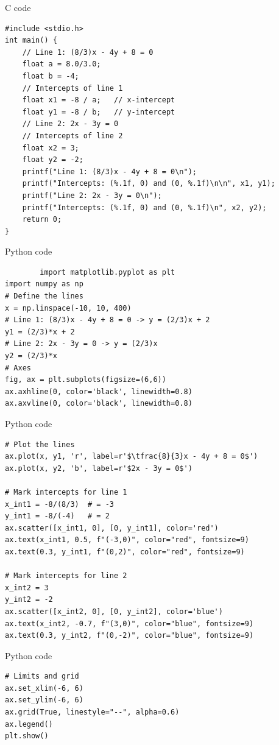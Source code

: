 \documentclass{beamer}
\begin{document}
\begin{frame}[fragile]{C code}
    \begin{lstlisting}
#include <stdio.h>
int main() {
    // Line 1: (8/3)x - 4y + 8 = 0
    float a = 8.0/3.0;
    float b = -4;
    // Intercepts of line 1
    float x1 = -8 / a;   // x-intercept
    float y1 = -8 / b;   // y-intercept
    // Line 2: 2x - 3y = 0
    // Intercepts of line 2
    float x2 = 3;
    float y2 = -2;
    printf("Line 1: (8/3)x - 4y + 8 = 0\n");
    printf("Intercepts: (%.1f, 0) and (0, %.1f)\n\n", x1, y1);
    printf("Line 2: 2x - 3y = 0\n");
    printf("Intercepts: (%.1f, 0) and (0, %.1f)\n", x2, y2);
    return 0;
}
    \end{lstlisting}
\end{frame}

\begin{frame}[fragile]{Python code}
    \begin{lstlisting}
        import matplotlib.pyplot as plt
import numpy as np
# Define the lines
x = np.linspace(-10, 10, 400)
# Line 1: (8/3)x - 4y + 8 = 0 -> y = (2/3)x + 2
y1 = (2/3)*x + 2
# Line 2: 2x - 3y = 0 -> y = (2/3)x
y2 = (2/3)*x
# Axes
fig, ax = plt.subplots(figsize=(6,6))
ax.axhline(0, color='black', linewidth=0.8)
ax.axvline(0, color='black', linewidth=0.8)
\end{lstlisting}
\end{frame}

\begin{frame}[fragile]{Python code}
\begin{lstlisting}
# Plot the lines
ax.plot(x, y1, 'r', label=r'$\tfrac{8}{3}x - 4y + 8 = 0$')
ax.plot(x, y2, 'b', label=r'$2x - 3y = 0$')

# Mark intercepts for line 1
x_int1 = -8/(8/3)  # = -3
y_int1 = -8/(-4)   # = 2
ax.scatter([x_int1, 0], [0, y_int1], color='red')
ax.text(x_int1, 0.5, f"(-3,0)", color="red", fontsize=9)
ax.text(0.3, y_int1, f"(0,2)", color="red", fontsize=9)

# Mark intercepts for line 2
x_int2 = 3
y_int2 = -2
ax.scatter([x_int2, 0], [0, y_int2], color='blue')
ax.text(x_int2, -0.7, f"(3,0)", color="blue", fontsize=9)
ax.text(0.3, y_int2, f"(0,-2)", color="blue", fontsize=9)
\end{lstlisting}
\end{frame}

\begin{frame}[fragile]{Python code}
\begin{lstlisting}
# Limits and grid
ax.set_xlim(-6, 6)
ax.set_ylim(-6, 6)
ax.grid(True, linestyle="--", alpha=0.6)
ax.legend()
plt.show()

    \end{lstlisting}
\end{frame}
\end{document}
